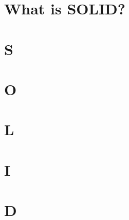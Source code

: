 \section{What is SOLID?} %
\label{sec:what_is_solid_}


\section{S} %
\label{sec:s}


\section{O} %
\label{sec:o}


\section{L} %
\label{sec:l}


\section{I} %
\label{sec:i}


\section{D} %
\label{sec:d}

